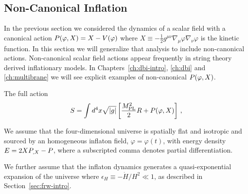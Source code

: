 \subsection{Non-Canonical Inflation} 
\label{sec:noncanoninfl}

In the previous section we considered the dynamics of a scalar field with a
canonical action $P(\varphi, X) = X - V(\varphi)$ where $X \equiv -\frac{1}{2}g^{\mu
\nu}\nabla_\mu \varphi \nabla_\nu \varphi$ is the kinetic function. 
In this
section we will generalize
that analysis to include non-canonical actions. Non-canonical scalar
field actions appear frequently in string theory derived inflationary models.
In Chapters~\ref{ch:dbi-intro}, \ref{ch:dbi} and \ref{ch:multibrane}
we will see explicit examples of non-canonical $P(\varphi,X)$.

The full action 
% 
\begin{equation}
\label{eq:DBIaction-dbiintro2}
S=\int  d^4x \sqrt{|g|} \left[ \frac{M_{\mathrm{PL}}^2}{2} R 
+ P (\varphi , X) \right] \,,
\end{equation}
% 


We assume that the four-dimensional universe is   
spatially flat and isotropic and sourced by an  
homogeneous inflaton field, $\varphi =\varphi (t)$, with energy 
density $E = 2XP_{,X} - P$, where a subscripted comma denotes partial
differentiation. 


We further assume that the inflaton dynamics  
generates a quasi-exponential expansion of the universe 
where $\epsilon_H \equiv -\dot{H}/H^2 \ll1$,
as described in Section~\ref{sec:frw-intro}. 

